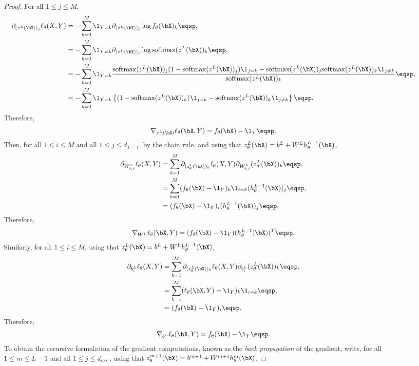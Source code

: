 \begin{proof}
For all $1\leqslant j\leqslant M$,
\begin{align*}
\partial_{(z^L(\bX))_j}\ell_{\theta}(X,Y) &=  -\sum_{k=1}^{M} \1_{Y=k}\partial_{(z^L(\bX))_j}\log f_{\theta}(\bX)_k\eqsp,\\
&=  -\sum_{k=1}^{M} \1_{Y=k}\partial_{(z^L(\bX))_j}\log \mathrm{softmax}(z^L(\bX))_k\eqsp,\\
&=  -\sum_{k=1}^{M} \1_{Y=k}\frac{\mathrm{softmax}(z^L(\bX))_j (1-\mathrm{softmax}(z^L(\bX))_j )\1_{j=k} - \mathrm{softmax}(z^L(\bX))_j \mathrm{softmax}(z^L(\bX))_k\1_{j\neq k}}{\mathrm{softmax}(z^L(\bX))_k}\eqsp,\\
&=  -\sum_{k=1}^{M} \1_{Y=k}\left\{(1-\mathrm{softmax}(z^L(\bX))_k )\1_{j=k} -  \mathrm{softmax}(z^L(\bX))_k\1_{j\neq k}\right\}\eqsp.
\end{align*}
Therefore,
$$
\nabla_{z^L(\bX)} \ell_{\theta}(\bX,Y) = f_{\theta}(\bX) - \1_Y\eqsp.
$$
Then, for all $1\leqslant i\leqslant M$ and all $1\leqslant j \leqslant d_{L-1}$, by the chain rule, and using that $z_{\theta}^L(\bX) = b^L + W^Lh_{\theta}^{L-1}(\bX)$,
\begin{align*}
\partial_{W^L_{i,j}}\ell_{\theta}(X,Y) &=  \sum_{k=1}^{M} \partial_{(z_{\theta}^L(\bX))_k}\ell_{\theta}(X,Y)\partial_{W^L_{i,j}}(z_{\theta}^L(\bX))_k\eqsp,\\
&=  \sum_{k=1}^{M} (f_{\theta}(\bX) - \1_Y)_k\1_{i=k}(h_{\theta}^{L-1}(\bX))_j\eqsp,\\
&=  (f_{\theta}(\bX) - \1_Y)_i(h_{\theta}^{L-1}(\bX))_j\eqsp.
\end{align*}
Therefore,
$$
\nabla_{W^L} \ell_{\theta}(\bX,Y) = (f_{\theta}(\bX) - \1_Y)(h_{\theta}^{L-1}(\bX))^T\eqsp.
$$
Similarly, for all $1\leqslant i\leqslant M$,  using that $z_{\theta}^L(\bX) = b^L + W^Lh_{\theta}^{L-1}(\bX)$,
\begin{align*}
\partial_{b^L_{i}}\ell_{\theta}(X,Y) &=  \sum_{k=1}^{M} \partial_{(z_{\theta}^L(\bX))_k}\ell_{\theta}(X,Y)\partial_{b^L_{i}}(z_{\theta}^L(\bX))_k\eqsp,\\
&=  \sum_{k=1}^{M} (\ell_{\theta}(\bX,Y) - \1_Y)_k\1_{i=k}\eqsp,\\
&=  (f_{\theta}(\bX) - \1_Y)_i\eqsp.
\end{align*}
Therefore,
$$
\nabla_{b^L} \ell_{\theta}(\bX,Y) = f_{\theta}(\bX) - \1_Y\eqsp.
$$
To obtain the recursive formulation of the gradient computations, known as the {\em back propagation} of the gradient, write, for all $1\leqslant m \leqslant L-1$ and all $1\leqslant j \leqslant d_m$, ,  using that $z_{\theta}^{m+1}(\bX) = b^{m+1} + W^{m+1}h_{\theta}^{m}(\bX)$,

\end{proof}
